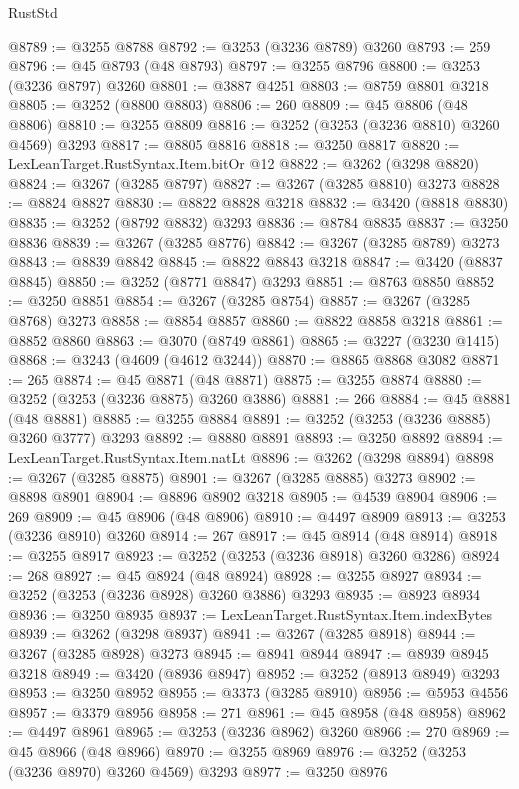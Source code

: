 \begin{lexlean}{RustStd}
\begin{coremodule}
{\begin{coremodule}
{{{{{{{{{{{{{{{{{{{{{{{{{{{{{{{{{{{{{{{@8789 := @3255 @8788
@8792 := @3253 (@3236 @8789) @3260
@8793 := 259
@8796 := @45 @8793 (@48 @8793)
@8797 := @3255 @8796
@8800 := @3253 (@3236 @8797) @3260
@8801 := @3887 @4251
@8803 := @8759 @8801 @3218
@8805 := @3252 (@8800 @8803)
@8806 := 260
@8809 := @45 @8806 (@48 @8806)
@8810 := @3255 @8809
@8816 := @3252 (@3253 (@3236 @8810) @3260 @4569) @3293
@8817 := @8805 @8816
@8818 := @3250 @8817
@8820 := LexLeanTarget.RustSyntax.Item.bitOr @12
@8822 := @3262 (@3298 @8820)
@8824 := @3267 (@3285 @8797)
@8827 := @3267 (@3285 @8810) @3273
@8828 := @8824 @8827
@8830 := @8822 @8828 @3218
@8832 := @3420 (@8818 @8830)
@8835 := @3252 (@8792 @8832) @3293
@8836 := @8784 @8835
@8837 := @3250 @8836
@8839 := @3267 (@3285 @8776)
@8842 := @3267 (@3285 @8789) @3273
@8843 := @8839 @8842
@8845 := @8822 @8843 @3218
@8847 := @3420 (@8837 @8845)
@8850 := @3252 (@8771 @8847) @3293
@8851 := @8763 @8850
@8852 := @3250 @8851
@8854 := @3267 (@3285 @8754)
@8857 := @3267 (@3285 @8768) @3273
@8858 := @8854 @8857
@8860 := @8822 @8858 @3218
@8861 := @8852 @8860
@8863 := @3070 (@8749 @8861)
@8865 := @3227 (@3230 @1415)
@8868 := @3243 (@4609 (@4612 @3244))
@8870 := @8865 @8868 @3082
@8871 := 265
@8874 := @45 @8871 (@48 @8871)
@8875 := @3255 @8874
@8880 := @3252 (@3253 (@3236 @8875) @3260 @3886)
@8881 := 266
@8884 := @45 @8881 (@48 @8881)
@8885 := @3255 @8884
@8891 := @3252 (@3253 (@3236 @8885) @3260 @3777) @3293
@8892 := @8880 @8891
@8893 := @3250 @8892
@8894 := LexLeanTarget.RustSyntax.Item.natLt
@8896 := @3262 (@3298 @8894)
@8898 := @3267 (@3285 @8875)
@8901 := @3267 (@3285 @8885) @3273
@8902 := @8898 @8901
@8904 := @8896 @8902 @3218
@8905 := @4539 @8904
@8906 := 269
@8909 := @45 @8906 (@48 @8906)
@8910 := @4497 @8909
@8913 := @3253 (@3236 @8910) @3260
@8914 := 267
@8917 := @45 @8914 (@48 @8914)
@8918 := @3255 @8917
@8923 := @3252 (@3253 (@3236 @8918) @3260 @3286)
@8924 := 268
@8927 := @45 @8924 (@48 @8924)
@8928 := @3255 @8927
@8934 := @3252 (@3253 (@3236 @8928) @3260 @3886) @3293
@8935 := @8923 @8934
@8936 := @3250 @8935
@8937 := LexLeanTarget.RustSyntax.Item.indexBytes
@8939 := @3262 (@3298 @8937)
@8941 := @3267 (@3285 @8918)
@8944 := @3267 (@3285 @8928) @3273
@8945 := @8941 @8944
@8947 := @8939 @8945 @3218
@8949 := @3420 (@8936 @8947)
@8952 := @3252 (@8913 @8949) @3293
@8953 := @3250 @8952
@8955 := @3373 (@3285 @8910)
@8956 := @5953 @4556
@8957 := @3379 @8956
@8958 := 271
@8961 := @45 @8958 (@48 @8958)
@8962 := @4497 @8961
@8965 := @3253 (@3236 @8962) @3260
@8966 := 270
@8969 := @45 @8966 (@48 @8966)
@8970 := @3255 @8969
@8976 := @3252 (@3253 (@3236 @8970) @3260 @4569) @3293
@8977 := @3250 @8976
}}}}}}}}}}}}}}}}}}}}}}}}}}}}}}}}}}}}}}}
\end{coremodule}}
\end{coremodule}
\end{lexlean}
